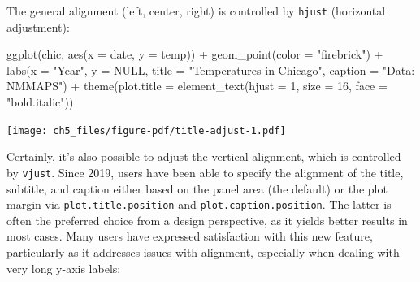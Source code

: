 \documentclass[
  letterpaper,
  DIV=11,
  numbers=noendperiod]{scrreprt}
\newenvironment{Shaded}{\begin{snugshade}}{\end{snugshade}}
\newcommand{\AttributeTok}[1]{\textcolor[rgb]{0.40,0.45,0.13}{#1}}
\newcommand{\ConstantTok}[1]{\textcolor[rgb]{0.56,0.35,0.01}{#1}}
\newcommand{\DecValTok}[1]{\textcolor[rgb]{0.68,0.00,0.00}{#1}}
\newcommand{\FunctionTok}[1]{\textcolor[rgb]{0.28,0.35,0.67}{#1}}
\newcommand{\NormalTok}[1]{\textcolor[rgb]{0.00,0.23,0.31}{#1}}
\newcommand{\SpecialCharTok}[1]{\textcolor[rgb]{0.37,0.37,0.37}{#1}}
\newcommand{\StringTok}[1]{\textcolor[rgb]{0.13,0.47,0.30}{#1}}
\begin{document}
The general alignment (left, center, right) is controlled by
\texttt{hjust} (horizontal adjustment):

\begin{Shaded}
\begin{Highlighting}[]
\FunctionTok{ggplot}\NormalTok{(chic, }\FunctionTok{aes}\NormalTok{(}\AttributeTok{x =}\NormalTok{ date, }\AttributeTok{y =}\NormalTok{ temp)) }\SpecialCharTok{+}
  \FunctionTok{geom\_point}\NormalTok{(}\AttributeTok{color =} \StringTok{"firebrick"}\NormalTok{) }\SpecialCharTok{+}
  \FunctionTok{labs}\NormalTok{(}\AttributeTok{x =} \StringTok{"Year"}\NormalTok{, }\AttributeTok{y =} \ConstantTok{NULL}\NormalTok{,}
       \AttributeTok{title =} \StringTok{"Temperatures in Chicago"}\NormalTok{,}
       \AttributeTok{caption =} \StringTok{"Data: NMMAPS"}\NormalTok{) }\SpecialCharTok{+}
  \FunctionTok{theme}\NormalTok{(}\AttributeTok{plot.title =} \FunctionTok{element\_text}\NormalTok{(}\AttributeTok{hjust =} \DecValTok{1}\NormalTok{, }\AttributeTok{size =} \DecValTok{16}\NormalTok{, }\AttributeTok{face =} \StringTok{"bold.italic"}\NormalTok{))}
\end{Highlighting}
\end{Shaded}

\texttt{[image: ch5\_files/figure-pdf/title-adjust-1.pdf]}

Certainly, it's also possible to adjust the vertical alignment, which is
controlled by \texttt{vjust}. Since 2019, users have been able to
specify the alignment of the title, subtitle, and caption either based
on the panel area (the default) or the plot margin via
\texttt{plot.title.position} and \texttt{plot.caption.position}. The
latter is often the preferred choice from a design perspective, as it
yields better results in most cases. Many users have expressed
satisfaction with this new feature, particularly as it addresses issues
with alignment, especially when dealing with very long y-axis labels:
\end{document}
